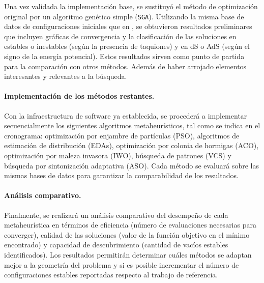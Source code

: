 Una vez validada la implementación base, se sustituyó el
método de optimización original por un algoritmo genético
simple (\texttt{SGA}). Utilizando la misma base de datos de
configuraciones iniciales que en \cite{Damian_2022}, se
obtuvieron resultados preliminares que incluyen gráficas de
convergencia y la clasificación de las soluciones en estables
o inestables (según la presencia de taquiones) y en dS o AdS
(según el signo de la energía potencial). Estos resultados
sirven como punto de partida para la comparación con otros
métodos. Además de haber arrojado elementos interesantes
y relevantes a la búsqueda.


\paragraph{Implementación de los métodos restantes.}

Con la infraestructura de software ya establecida, se
procederá a implementar secuencialmente los siguientes
algoritmos metaheurísticos, tal como se indica en el
cronograma: optimización por enjambre de partículas (PSO),
algoritmos de estimación de distribución (EDAs), optimización
por colonia de hormigas (ACO), optimización por maleza
invasora (IWO), búsqueda de patrones (VCS) y búsqueda por
sintonización adaptativa (ASO). Cada método se evaluará sobre
las mismas bases de datos para garantizar la comparabilidad
de los resultados.


\paragraph{Análisis comparativo.}

Finalmente, se realizará un análisis comparativo del
desempeño de cada metaheurística en términos de eficiencia
(número de evaluaciones necesarias para converger), calidad
de las soluciones (valor de la función objetivo en el mínimo
encontrado) y capacidad de descubrimiento (cantidad de vacíos
estables identificados). Los resultados permitirán determinar
cuáles métodos se adaptan mejor a la geometría del problema y
si es posible incrementar el número de configuraciones
estables reportadas respecto al trabajo de referencia.
